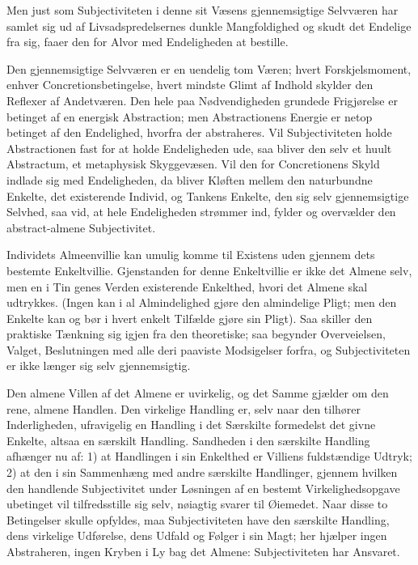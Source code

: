 \documentclass[12pt]{book}
\newcommand{\opage}[1]{\marginnote{\footnotesize\textit{[#1]}}}
\begin{document}
Men just som Subjectiviteten i denne sit Væsens gjennemsigtige
Selvværen har samlet sig ud af Livsadspredelsernes dunkle
Mangfoldighed og skudt det Endelige fra sig, faaer den for Alvor med
Endeligheden at bestille.

Den gjennemsigtige Selvværen er en uendelig tom Væren; hvert
Forskjelsmoment, enhver Concretionsbetingelse, hvert mindste Glimt
af Indhold skylder den Reflexer af Andetværen. Den hele paa
Nødvendigheden grundede Frigjørelse er betinget af en energisk
Abstraction; men Abstractionens Energie er netop betinget af den
Endelighed, hvorfra der abstraheres. Vil Subjectiviteten holde
Abstractionen fast for at holde Endeligheden ude, saa bliver den
selv et huult Abstractum, et metaphysisk Skyggevæsen. Vil den for
Concretionens Skyld indlade sig med Endeligheden, da bliver Kløften
mellem den naturbundne Enkelte, det existerende Individ, og Tankens
Enkelte, den sig selv gjennemsigtige Selvhed, saa vid, at hele
Endeligheden strømmer ind, fylder og overvælder den abstract-almene
Subjectivitet.

Individets Almeenvillie kan umulig komme til Existens uden gjennem
dets bestemte Enkeltvillie. Gjenstanden for denne Enkeltvillie er
ikke det Almene selv, men en i Tin%
\opage{57}genes Verden existerende Enkelthed, hvori det Almene skal udtrykkes.
(Ingen kan i al Almindelighed gjøre den almindelige Pligt; men den
Enkelte kan og bør i hvert enkelt Tilfælde gjøre sin Pligt). Saa
skiller den praktiske Tænkning sig igjen fra den theoretiske; saa
begynder Overveielsen, Valget, Beslutningen med alle deri paaviste
Modsigelser forfra, og Subjectiviteten er ikke længer sig selv
gjennemsigtig.

Den almene Villen af det Almene er uvirkelig, og det Samme gjælder
om den rene, almene Handlen. Den virkelige Handling er, selv naar
den tilhører Inderligheden, ufravigelig en Handling i det Særskilte
formedelst det givne Enkelte, altsaa en særskilt Handling. Sandheden
i den særskilte Handling afhænger nu af: 1) at Handlingen i sin
Enkelthed er Villiens fuldstændige Udtryk; 2) at den i sin
Sammenhæng med andre særskilte Handlinger, gjennem hvilken den
handlende Subjectivitet under Løsningen af en bestemt
Virkelighedsopgave ubetinget vil tilfredsstille sig selv, nøiagtig
svarer til Øiemedet. Naar disse to Betingelser skulle opfyldes, maa
Subjectiviteten have den særskilte Handling, dens virkelige
Udførelse, dens Udfald og Følger i sin Magt; her hjælper ingen
Abstraheren, ingen Kryben i Ly bag det Almene: Subjectiviteten har
Ansvaret.
\end{document}
